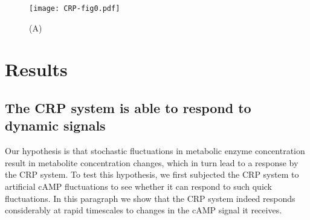 \begin{figure}
	\centering
	\texttt{[image: CRP-fig0.pdf]}
	\caption{ 
		(A) 
	}
	\label{fig:CRP:fig0}
\end{figure}


%
% 

\section*{Results}

\subsection*{The CRP system is able to respond to dynamic signals}

Our hypothesis is that stochastic fluctuations in metabolic enzyme concentration result in metabolite concentration changes, which in turn lead to a response by the CRP system.
%
To test this hypothesis, we first subjected the CRP system to artificial cAMP fluctuations to see whether it can respond to such quick fluctuations.
%
%
In this paragraph we show that the CRP system indeed responds considerably at rapid timescales to changes in the cAMP signal it receives.


